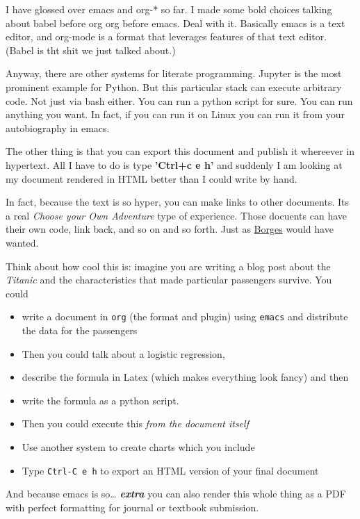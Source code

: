 \documentclass[11pt]{article}
\begin{document}
I have glossed over emacs and org-* so far. I made some bold choices talking about babel before org org before emacs. Deal with it. Basically emacs is a text editor, and org-mode is a format that leverages features of that text editor. (Babel is tht shit we just talked about.)

Anyway, there are other systems for literate programming. Jupyter is the most prominent example for Python. But this particular stack can execute arbitrary code. Not just via bash either. You can run a python script for sure. You can run anything you want. In fact, if you can run it on Linux you can run it from your autobiography in emacs.

The other thing is that you can export this document and publish it whereever in hypertext. All I have to do is type \textbf{'Ctrl+c e h'} and suddenly I am looking at my document rendered in HTML better than I could write by hand.  

In fact, because the text is so hyper, you can make links to other documents. Its a real \emph{Choose your Own Adventure} type of experience. Those docuents can have their own code, link back, and so on and so forth. Just as \href{https://en.wikipedia.org/wiki/The\_Library\_of\_Babel}{Borges} would have wanted. 

Think about how cool this is: imagine you are writing a blog post about the \emph{Titanic} and the characteristics that made particular passengers survive. You could
\begin{itemize}
\item write a document in \texttt{org} (the format and plugin) using \texttt{emacs} and distribute the data for the passengers
\item Then you could talk about a logistic regression,
\item describe the formula in Latex (which makes everything look fancy) and then
\item write the formula as a python script.
\item Then you could execute this \emph{from the document itself}
\item Use another system to create charts which you include
\item Type \texttt{Ctrl-C e h} to export an HTML version of your final document
\end{itemize}

And because emacs is so\ldots{} \textbf{\emph{extra}} you can also render this whole thing as a PDF with perfect formatting for journal or textbook submission.
\end{document}
